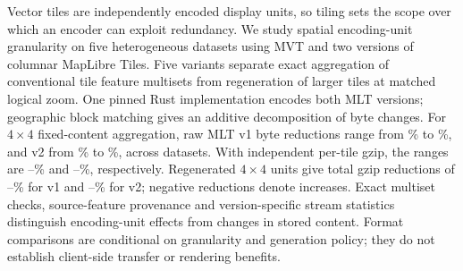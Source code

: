 
Vector tiles are independently encoded display units, so tiling sets the scope over
which an encoder can exploit redundancy. We study spatial encoding-unit granularity
on five heterogeneous datasets using MVT and two versions of columnar MapLibre Tiles.
Five variants separate exact aggregation of conventional tile feature multisets from
regeneration of larger tiles at matched logical zoom. One pinned Rust implementation
encodes both MLT versions; geographic block matching gives an additive decomposition
of byte changes. For $4\times4$ fixed-content aggregation, raw MLT v1 byte reductions
range from \ExtOneRawAggregationMin\% to \ExtOneRawAggregationMax\%, and v2 from
\ExtTwoRawAggregationMin\% to \ExtTwoRawAggregationMax\%, across datasets. With
independent per-tile gzip, the ranges are
\ExtOneGzipAggregationMin--\ExtOneGzipAggregationMax\% and
\ExtTwoGzipAggregationMin--\ExtTwoGzipAggregationMax\%, respectively. Regenerated
$4\times4$ units give total gzip reductions of
\ExtOneGzipTotalMin--\ExtOneGzipTotalMax\% for v1 and
\ExtTwoGzipTotalMin--\ExtTwoGzipTotalMax\% for v2; negative reductions denote increases.
Exact multiset checks, source-feature provenance and version-specific stream statistics
distinguish encoding-unit effects from changes in stored content. Format comparisons
are conditional on granularity and generation policy; they do not establish
client-side transfer or rendering benefits.
